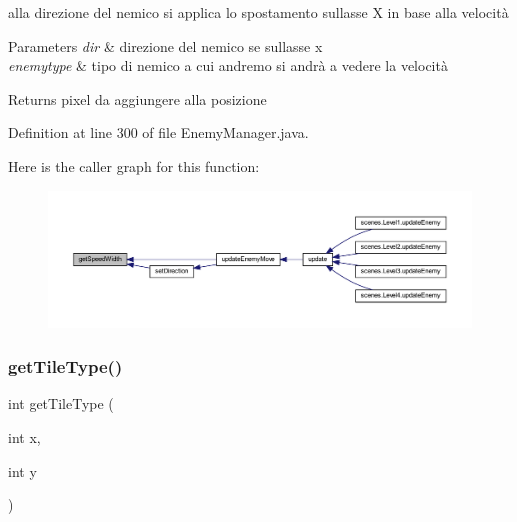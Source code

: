 alla direzione del nemico si applica lo spostamento sull\textquotesingle{}asse X in base alla velocità 


\begin{DoxyParams}{Parameters}
{\em dir} & direzione del nemico se sull\textquotesingle{}asse x \\
\hline
{\em enemytype} & tipo di nemico a cui andremo si andrà a vedere la velocità\\
\hline
\end{DoxyParams}
\begin{DoxyReturn}{Returns}
pixel da aggiungere alla posizione 
\end{DoxyReturn}


Definition at line 300 of file Enemy\+Manager.\+java.

Here is the caller graph for this function\+:\nopagebreak
\begin{figure}[H]
\begin{center}
\leavevmode
\includegraphics[width=350pt]{classmanagers_1_1_enemy_manager_ae622455c9dd19d2583b9a8840b1b35de_icgraph}
\end{center}
\end{figure}
\mbox{\label{classmanagers_1_1_enemy_manager_ac689e72523c8460ac3160526d310b1b7}} 
\subsubsection{\texorpdfstring{get\+Tile\+Type()}{getTileType()}}
{\footnotesize\ttfamily int get\+Tile\+Type (\begin{DoxyParamCaption}\item[{int}]{x,  }\item[{int}]{y }\end{DoxyParamCaption})\hspace{0.3cm}{\ttfamily [private]}}




